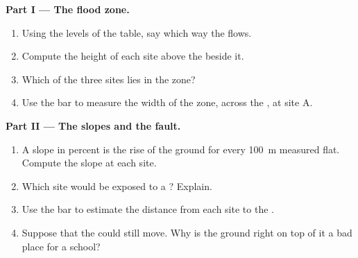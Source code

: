 \begin{problem}
\noindent\textbf{Part I --- The flood zone.}\par\nopagebreak
\begin{enumerate}[beginpenalty=10000]
  \item Using the  levels of the table, say which way the 
        flows.
  \item Compute the height of each site above the  beside it.
  \item Which of the three sites lies in the  zone?
  \item Use the  bar to measure the width of the  zone, across
        the , at site A.
\end{enumerate}

\noindent\textbf{Part II --- The slopes and the fault.}\par\nopagebreak
\begin{enumerate}[resume, beginpenalty=10000]
  \item A slope in percent is the rise of the ground for every
        \qty{100}{m} measured flat. Compute the slope at each site.
  \item Which site would be exposed to a ? Explain.
  \item Use the  bar to estimate the distance from each site to the
        .
  \item Suppose that the  could still move. Why is the ground right
        on top of it a bad place for a school?
\end{enumerate}


\end{problem}

